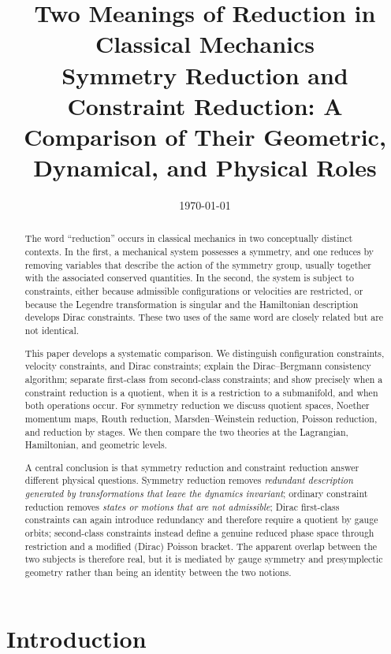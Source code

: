 \documentclass[11pt,a4paper]{article}
\title{\textbf{Two Meanings of Reduction in Classical Mechanics}\\
\large Symmetry Reduction and Constraint Reduction: A Comparison of Their Geometric, Dynamical, and Physical Roles}
\author{}
\date{\today}
\theoremstyle{definition}
\begin{document}
\maketitle

\begin{abstract}
The word ``reduction'' occurs in classical mechanics in two conceptually distinct
contexts.  In the first, a mechanical system possesses a symmetry, and one
reduces by removing variables that describe the action of the symmetry group,
usually together with the associated conserved quantities.  In the second, the
system is subject to constraints, either because admissible configurations or
velocities are restricted, or because the Legendre transformation is singular
and the Hamiltonian description develops Dirac constraints.  These two uses of
the same word are closely related but are not identical.

This paper develops a systematic comparison.  We distinguish configuration
constraints, velocity constraints, and Dirac constraints; explain the
Dirac--Bergmann consistency algorithm; separate first-class from second-class
constraints; and show precisely when a constraint reduction is a quotient,
when it is a restriction to a submanifold, and when both operations occur.
For symmetry reduction we discuss quotient spaces, Noether momentum maps,
Routh reduction, Marsden--Weinstein reduction, Poisson reduction, and
reduction by stages.  We then compare the two theories at the Lagrangian,
Hamiltonian, and geometric levels.

A central conclusion is that symmetry reduction and constraint reduction
answer different physical questions.  Symmetry reduction removes \emph{redundant
description generated by transformations that leave the dynamics invariant};
ordinary constraint reduction removes \emph{states or motions that are not
admissible}; Dirac first-class constraints can again introduce redundancy and
therefore require a quotient by gauge orbits; second-class constraints instead
define a genuine reduced phase space through restriction and a modified
(Dirac) Poisson bracket.  The apparent overlap between the two subjects is
therefore real, but it is mediated by gauge symmetry and presymplectic
geometry rather than being an identity between the two notions.
\end{abstract}

\tableofcontents

\section{Introduction}
\end{document}

